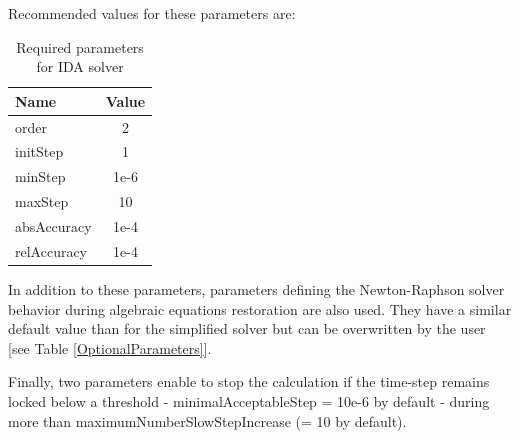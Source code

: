 \documentclass[a4paper, 12pt]{report}
\begin{document}
Recommended values for these parameters are:
\begin{table}[h!]
\center
\begin{tabular}{ l | c }
\toprule
\textbf{{Name}} & \textbf{{Value}} \\
\midrule
order & 2 \\
initStep & 1 \\
minStep & 1e-6 \\
maxStep & 10 \\
absAccuracy & 1e-4 \\
relAccuracy & 1e-4 \\
\bottomrule
\end{tabular}
\caption{Required parameters for \ac{IDA} solver}
\end{table}

In addition to these parameters, parameters defining the Newton-Raphson solver behavior during algebraic equations restoration are also used. They have a similar default value than for the simplified solver but can be overwritten by the user [see Table \ref{OptionalParameters}].

Finally, two parameters enable to stop the calculation if the time-step remains locked below a threshold - minimalAcceptableStep = 10e-6 by default - during more than
maximumNumberSlowStepIncrease (= 10 by default).


\end{document}
